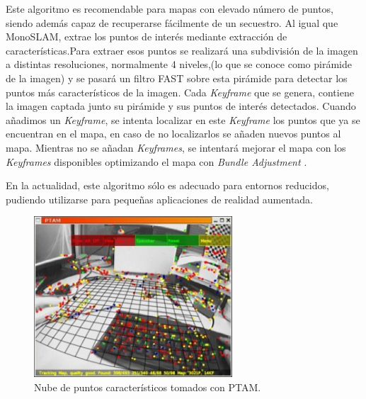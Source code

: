 Este algoritmo es recomendable para mapas con elevado número de puntos, siendo además capaz de recuperarse fácilmente de un secuestro. Al igual que MonoSLAM, extrae los puntos de interés mediante extracción de características.Para extraer esos puntos se realizará una subdivisión de la imagen a distintas resoluciones, normalmente 4 niveles,(lo que se conoce como pirámide de la imagen) y se pasará un filtro FAST sobre esta pirámide para detectar los puntos más característicos de la imagen.
Cada \textit{Keyframe} que se genera, contiene  la imagen captada junto su pirámide y sus puntos de interés detectados. Cuando añadimos un \textit{Keyframe}, se intenta localizar en este \textit{Keyframe} los puntos que ya se encuentran en el mapa, en caso de no localizarlos se añaden nuevos puntos al mapa. Mientras no se añadan \textit{Keyframes}, se intentará mejorar el mapa con los \textit{Keyframes} disponibles optimizando el mapa con \textit{Bundle Adjustment \cite{BundleAdjust08}}.

En la actualidad, este algoritmo sólo es adecuado para entornos reducidos, pudiendo utilizarse para pequeñas aplicaciones de realidad aumentada.

\begin{figure}[H]
\begin{center}
\includegraphics[height=6.0cm]{img/cap4/ptam_screenshot-300x243.jpg}
\end{center}
\caption{Nube de puntos característicos tomados con PTAM.}
\end{figure}



\clearpage

